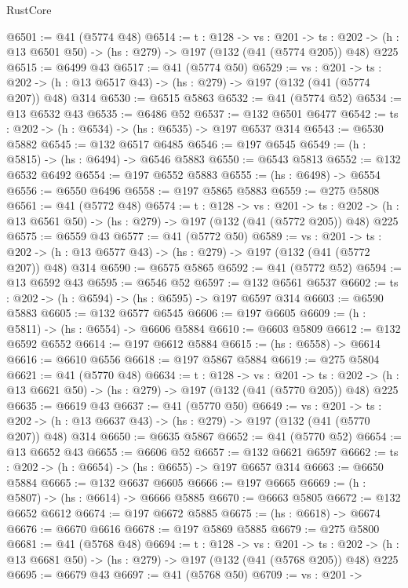 \begin{lexlean}{RustCore}
\begin{coremodule}
@6501 := @41 (@5774 @48)
@6514 := {t : @128} ->
  {vs : @201} ->
  {ts : @202} -> (h : @13 @6501 @50) -> (hs : @279) -> @197 (@132 (@41 (@5774 @205)) @48) @225
@6515 := @6499 @43
@6517 := @41 (@5774 @50)
@6529 := {vs : @201} ->
  {ts : @202} -> (h : @13 @6517 @43) -> (hs : @279) -> @197 (@132 (@41 (@5774 @207)) @48) @314
@6530 := @6515 @5863
@6532 := @41 (@5774 @52)
@6534 := @13 @6532 @43
@6535 := @6486 @52
@6537 := @132 @6501 @6477
@6542 := {ts : @202} -> (h : @6534) -> (hs : @6535) -> @197 @6537 @314
@6543 := @6530 @5882
@6545 := @132 @6517 @6485
@6546 := @197 @6545
@6549 := (h : @5815) -> (hs : @6494) -> @6546 @5883
@6550 := @6543 @5813
@6552 := @132 @6532 @6492
@6554 := @197 @6552 @5883
@6555 := (hs : @6498) -> @6554
@6556 := @6550 @6496
@6558 := @197 @5865 @5883
@6559 := @275 @5808
@6561 := @41 (@5772 @48)
@6574 := {t : @128} ->
  {vs : @201} ->
  {ts : @202} -> (h : @13 @6561 @50) -> (hs : @279) -> @197 (@132 (@41 (@5772 @205)) @48) @225
@6575 := @6559 @43
@6577 := @41 (@5772 @50)
@6589 := {vs : @201} ->
  {ts : @202} -> (h : @13 @6577 @43) -> (hs : @279) -> @197 (@132 (@41 (@5772 @207)) @48) @314
@6590 := @6575 @5865
@6592 := @41 (@5772 @52)
@6594 := @13 @6592 @43
@6595 := @6546 @52
@6597 := @132 @6561 @6537
@6602 := {ts : @202} -> (h : @6594) -> (hs : @6595) -> @197 @6597 @314
@6603 := @6590 @5883
@6605 := @132 @6577 @6545
@6606 := @197 @6605
@6609 := (h : @5811) -> (hs : @6554) -> @6606 @5884
@6610 := @6603 @5809
@6612 := @132 @6592 @6552
@6614 := @197 @6612 @5884
@6615 := (hs : @6558) -> @6614
@6616 := @6610 @6556
@6618 := @197 @5867 @5884
@6619 := @275 @5804
@6621 := @41 (@5770 @48)
@6634 := {t : @128} ->
  {vs : @201} ->
  {ts : @202} -> (h : @13 @6621 @50) -> (hs : @279) -> @197 (@132 (@41 (@5770 @205)) @48) @225
@6635 := @6619 @43
@6637 := @41 (@5770 @50)
@6649 := {vs : @201} ->
  {ts : @202} -> (h : @13 @6637 @43) -> (hs : @279) -> @197 (@132 (@41 (@5770 @207)) @48) @314
@6650 := @6635 @5867
@6652 := @41 (@5770 @52)
@6654 := @13 @6652 @43
@6655 := @6606 @52
@6657 := @132 @6621 @6597
@6662 := {ts : @202} -> (h : @6654) -> (hs : @6655) -> @197 @6657 @314
@6663 := @6650 @5884
@6665 := @132 @6637 @6605
@6666 := @197 @6665
@6669 := (h : @5807) -> (hs : @6614) -> @6666 @5885
@6670 := @6663 @5805
@6672 := @132 @6652 @6612
@6674 := @197 @6672 @5885
@6675 := (hs : @6618) -> @6674
@6676 := @6670 @6616
@6678 := @197 @5869 @5885
@6679 := @275 @5800
@6681 := @41 (@5768 @48)
@6694 := {t : @128} ->
  {vs : @201} ->
  {ts : @202} -> (h : @13 @6681 @50) -> (hs : @279) -> @197 (@132 (@41 (@5768 @205)) @48) @225
@6695 := @6679 @43
@6697 := @41 (@5768 @50)
@6709 := {vs : @201} ->

\end{coremodule}
\end{lexlean}
